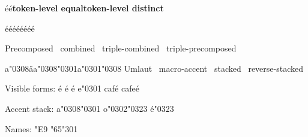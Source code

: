 \documentclass{article}
\newcommand\verdict[1]{\ifx\dec\pre\textbf{#1 equal}\else\textbf{#1 distinct}\fi}
\begin{document}
\def\pre{é}\def\dec{é}
\verdict{token-level}\par
{}\hbox{é}\hbox{é}\hbox{ééé}\hbox{ééé}
\ifdim\wd0=\wd2 precomposed-width-equals-combining-width\else widths-differ\fi\par
Precomposed \the{}\ combined \the{}\ triple-combined \the{}\ triple-precomposed \the{}\par
{}\hbox{a\char"0308}\hbox{\"a}\hbox{a\char"0308\char"0301}\hbox{a\char"0301\char"0308}
Umlaut \the{}\ macro-accent \the{}\ stacked \the{}\ reverse-stacked \the{}\par
Visible forms: é é \'e e\char"0301 café cafeé\par
Accent stack: a\char"0308\char"0301 o\char"0302\char"0323 é\char"0323\par
Names: \Uchar"E9 \Uchar"65\Uchar"301\par
\end{document}
